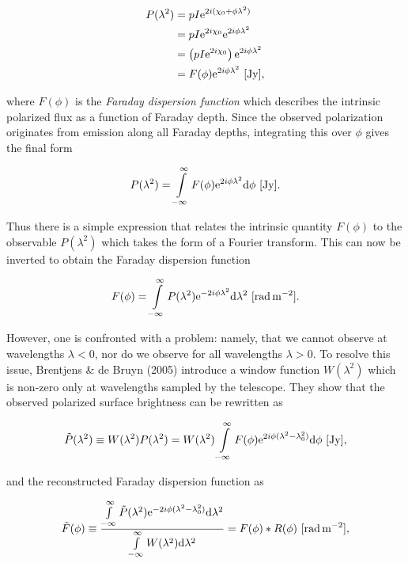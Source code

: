 \documentclass[a4paper,10pt]{article}
\begin{document}
\begin{align*}
    P(\lambda^2) &= pI\mathrm{e}^{2i(\chi_0+\phi\lambda^2)}\\
    &= pI\mathrm{e}^{2i\chi_0}\mathrm{e}^{2i\phi\lambda^2}\\
    &= \left(pI\mathrm{e}^{2i\chi_0}\right)\mathrm{e}^{2i\phi\lambda^2}\\
    &= F(\phi)\mathrm{e}^{2i\phi\lambda^2} ~ [{\rm Jy}],
\end{align*}

{\noindent}where $F(\phi)$ is the \textit{Faraday dispersion function} which describes the intrinsic polarized flux as a function of Faraday depth. Since the observed polarization originates from emission along all Faraday depths, integrating this over $\phi$ gives the final form

\begin{align*}
    P(\lambda^2) = \int\limits_{-\infty}^\infty F(\phi)\mathrm{e}^{2i\phi\lambda^2}\mathrm{d}\phi ~ [{\rm Jy}].
\end{align*}

{\noindent}Thus there is a simple expression that relates the intrinsic quantity $F(\phi)$ to the observable $P(\lambda^2)$ which takes the form of a Fourier transform. This can now be inverted to obtain the Faraday dispersion function

\begin{align*}
    F(\phi) = \int\limits_{-\infty}^\infty P(\lambda^2)\mathrm{e}^{-2i\phi\lambda^2}\mathrm{d}\lambda^2 ~ [{\rm rad\,m^{-2}}].
\end{align*}

{\noindent}However, one is confronted with a problem: namely, that we cannot observe at wavelengths $\lambda<0$, nor do we observe for all wavelengths $\lambda>0$. To resolve this issue, Brentjens \& de Bruyn (2005) introduce a window function $W(\lambda^2)$ which is non-zero only at wavelengths sampled by the telescope. They show that the observed polarized surface brightness can be rewritten as 

\begin{align*}
    \tilde{P}(\lambda^2) \equiv W(\lambda^2)P(\lambda^2) = W(\lambda^2) \int\limits_{-\infty}^\infty F(\phi)\mathrm{e}^{2i\phi(\lambda^2-\lambda_0^2)}\mathrm{d}\phi ~ [{\rm Jy}],
\end{align*}

{\noindent}and the reconstructed Faraday dispersion function as

\begin{align*}
    \tilde{F}(\phi) \equiv \dfrac{\int\limits_{-\infty}^\infty \tilde{P}(\lambda^2)\mathrm{e}^{-2i\phi(\lambda^2-\lambda_0^2)}\mathrm{d}\lambda^2}{\int\limits_{-\infty}^\infty W(\lambda^2)\mathrm{d}\lambda^2} = F(\phi) * R(\phi) ~ [{\rm rad\,m^{-2}}],
\end{align*}
\end{document}
